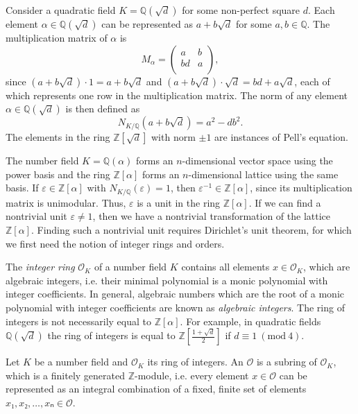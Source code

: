 \begin{example}
  Consider a quadratic field $K = ℚ(\sqrt{d})$ for some non-perfect square $d$.
  Each element $α ∈ ℚ(\sqrt{d})$ can be represented as $a + b \sqrt{d}$ for some $a, b ∈ ℚ$.
  The multiplication matrix of $α$ is
  \[
    M_α =
    \begin{pmatrix}
      a & b \\
      bd & a \\
    \end{pmatrix},
  \]
  since
  $(a + b \sqrt{d}) · 1 = a + b \sqrt{d}$ and
  $(a + b \sqrt{d}) · \sqrt{d} = bd + a \sqrt{d}$,
  each of which represents one row in the multiplication matrix.
  The norm of any element $α ∈ ℚ(\sqrt{d})$ is then defined as
  \[
    N_{K/ℚ}(a + b \sqrt{d}) = a^2 - d b^2.
  \]
  The elements in the ring $ℤ[\sqrt{d}]$ with norm $±1$
  are instances of Pell's equation.
\end{example}

The number field $K = ℚ(α)$ forms an $n$-dimensional vector space using the power basis
and the ring $ℤ[α]$ forms an $n$-dimensional lattice using the same basis.
If $ε ∈ ℤ[α]$ with $N_{K/ℚ}(ε) = 1$, then $ε^{-1} ∈ ℤ[α]$,
since its multiplication matrix is unimodular.
Thus, $ε$ is a unit in the ring $ℤ[α]$.
If we can find a nontrivial unit $ε ≠ 1$,
then we have a nontrivial transformation of the lattice $ℤ[α]$.
Finding such a nontrivial unit requires Dirichlet's unit theorem,
for which we first need the notion of integer rings and orders.

The \emph{integer ring} $\mathcal O_K$ of a number field $K$
contains all elements $x ∈ \mathcal O_K$, which are algebraic integers,
i.e. their minimal polynomial is a monic polynomial with integer coefficients.
In general, algebraic numbers which are the root of a monic polynomial with integer coefficients
are known as \emph{algebraic integers}.
The ring of integers is not necessarily equal to $ℤ[α]$.
For example, in quadratic fields $ℚ(\sqrt{d})$
the ring of integers is equal to $ℤ\left[\frac{1+\sqrt{d}}{2}\right]$ if $d ≡ 1\ (\mathrm{mod}\ 4)$.

\begin{definition}
  Let $K$ be a number field and $\mathcal O_K$ its ring of integers.
  An  $\mathcal O$ is a subring of $\mathcal O_K$,
  which is a finitely generated $ℤ$-module,
  i.e. every element $x ∈ \mathcal O$ can be represented as an integral
  combination of a fixed, finite set of elements $x₁, x₂, …, xₙ ∈ \mathcal O$.
\end{definition}

